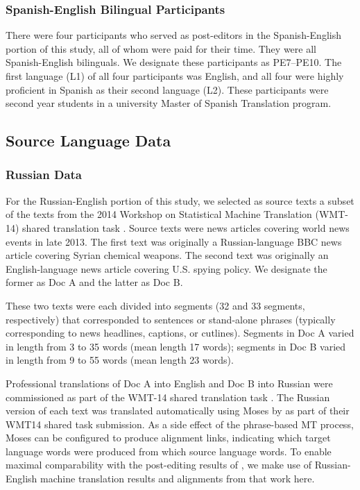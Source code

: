 \subsubsection{Spanish-English Bilingual Participants}

There were four participants who served as post-editors in the Spanish-English portion of this study, all of whom were paid for their time. 
%
They were all Spanish-English bilinguals.
%
We designate these participants as PE7--PE10.
%
The first language (L1) of all four participants was English, and all four were highly proficient in Spanish as their second language (L2). 
%
These participants were second year students in a university Master of Spanish Translation program. 

\subsection{Source Language Data}

\subsubsection{Russian Data}

For the Russian-English portion of this study, we selected as source texts a subset of the texts from the 2014 Workshop on Statistical Machine Translation (WMT-14) shared translation task \citep{2014_WMT_Bojar_etal}.
%
Source texts were news articles covering world news events in late 2013.
%
The first text was originally a Russian-language BBC news article covering Syrian chemical weapons.
%
The second text was originally an English-language news article covering U.S. spying policy.
%
We designate the former as Doc A and the latter as Doc B.

These two texts were each divided into segments (32 and 33 segments, respectively) that corresponded to sentences or stand-alone phrases (typically corresponding to news headlines, captions, or cutlines).
%
Segments in Doc A varied in length from 3 to 35 words (mean length 17 words); 
%
segments in Doc B varied in length from 9 to 55 words (mean length 23 words).


Professional translations of Doc A into English and Doc B into Russian were commissioned as part of the WMT-14 shared translation task \citep{2014_WMT_Bojar_etal}.
%
%
The Russian version of each text was translated automatically using Moses \citep{2007_ACL_Koehn} by \citet{2014_WMT_Schwartz_etal} as part of their WMT14 shared task submission.
%
As a side effect of the phrase-based MT process, Moses can be configured to produce alignment links, indicating which target language words were produced from which source language words.
%
To enable maximal comparability with the post-editing results of \citet{2014_WMT_Schwartz_etal}, we make use of Russian-English machine translation results and alignments from that work here.



